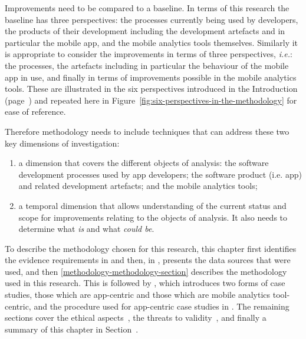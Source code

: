 Improvements need to be compared to a baseline. In terms of this research the baseline has three perspectives: the processes currently being used by developers, the products of their development including the development artefacts and in particular the mobile app, and the mobile analytics tools themselves. Similarly it is appropriate to consider the improvements in terms of three perspectives, \textit{i.e.}: the processes, the artefacts including in particular the behaviour of the mobile app in use, and finally in terms of improvements possible in the mobile analytics tools. These are illustrated in the six perspectives introduced in the Introduction (page~\pageref{rq-leads-to-six-perspectives}) and repeated here in Figure~\ref{fig:six-perspectives-in-the-methodology} for ease of reference.

Therefore methodology needs to include techniques that can address these two key dimensions of investigation:
\begin{enumerate}
    \item a dimension that covers the different objects of analysis: the software development processes used by app developers; the software product (i.e. app) and related development artefacts; and the mobile analytics tools; 
    
    \item a temporal dimension that allows understanding of the current status and scope for improvements relating to the objects of analysis. It also needs to determine what \emph{is} and what \emph{could be}.
\end{enumerate}


\medskip

To describe the methodology chosen for this research, this chapter first identifies the evidence requirements in  and then, in , presents the data sources that were used, and then \autoref{methodology-methodology-section} describes the methodology used in this research. This is followed by , which introduces two forms of case studies, those which are app-centric and those which are mobile analytics tool-centric, and the procedure used for app-centric case studies in . The remaining sections cover the ethical aspects~, the threats to validity~, and finally a summary of this chapter in Section~. 

